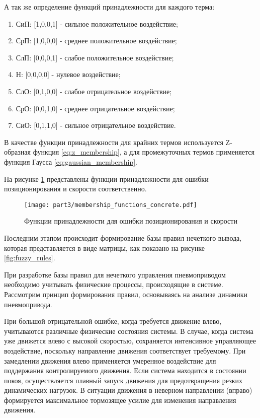 А так же определение функций принадлежности для каждого терма:
\begin{enumerate}
	\item СиП: [1,0,0,1] - сильное положительное воздействие;
	\item СрП: [1,0,0,0] - среднее положительное воздействие;
	\item СлП: [0,0,0,1] - слабое положительное воздействие;
	\item Н: [0,0,0,0] - нулевое воздействие;
	\item СлО: [0,1,0,0] - слабое отрицательное воздействие;
	\item СрО: [0,0,1,0] - среднее отрицательное воздействие;
	\item СиО: [0,1,1,0] - сильное отрицательное воздействие.
\end{enumerate}

В качестве функции принадлежности для крайних термов используется Z-образная функция \ref{eq:z_membership},
а для промежуточных термов применяется функция Гаусса \ref{eq:gaussian_membership}.

На рисунке \ref{fig:membership_functions_concrete} представлены функции принадлежности
для ошибки позиционирования и скорости соответственно.

\begin{figure}[ht]
	\centering
	\texttt{[image: part3/membership\_functions\_concrete.pdf]}
	\caption{Функции принадлежности для ошибки позиционирования и скорости}
	\label{fig:membership_functions_concrete}
\end{figure}

Последним этапом происходит формирование базы правил нечеткого вывода, которая представляется
в виде матрицы, как показано на рисунке \ref{fig:fuzzy_rules}.

При разработке базы правил для нечеткого управления пневмоприводом
необходимо учитывать физические процессы, происходящие в системе.
Рассмотрим принцип формирования правил, основываясь на анализе
динамики пневмопривода.

При большой отрицательной ошибке, когда требуется движение влево,
учитываются различные физические состояния системы. В случае,
когда система уже движется влево с высокой скоростью, сохраняется
интенсивное управляющее воздействие, поскольку направление движения
соответствует требуемому. При замедлении движения влево применяется
умеренное воздействие для поддержания контролируемого движения.
Если система находится в состоянии покоя, осуществляется плавный
запуск движения для предотвращения резких динамических нагрузок.
В ситуации движения в неверном направлении (вправо) формируется
максимальное тормозящее усилие для изменения направления движения.

